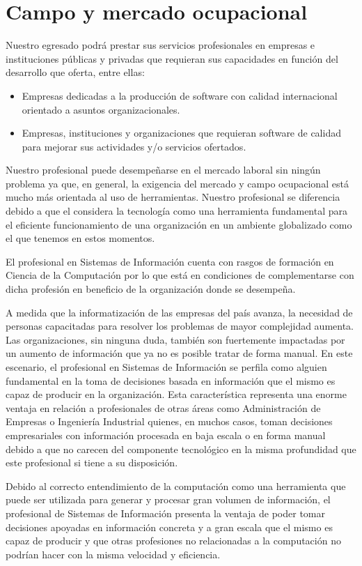 \section{Campo y mercado ocupacional}\label{sec:job-positions}
Nuestro egresado podrá prestar sus servicios profesionales en empresas e instituciones públicas y privadas 
que requieran sus capacidades en función del desarrollo que oferta, entre ellas:

\begin{itemize}
\item Empresas dedicadas a la producción de software con calidad internacional orientado a asuntos organizacionales.
\item Empresas, instituciones y organizaciones que requieran software de calidad para mejorar sus actividades y/o 
      servicios ofertados.
\end{itemize}

Nuestro profesional puede desempeñarse en el mercado laboral sin ningún problema ya que, en general, la 
exigencia del mercado y campo ocupacional está mucho más orientada al uso de herramientas. 
Nuestro profesional se diferencia debido a que el considera la tecnologí­a como una herramienta fundamental
para el eficiente funcionamiento de una organización en un ambiente globalizado como el que tenemos en estos momentos.

El profesional en Sistemas de Información cuenta con rasgos de formación en Ciencia de la Computación por 
lo que está en condiciones de complementarse con dicha profesión en beneficio de la organización donde se desempeña.

A medida que la informatización de las empresas del paí­s avanza, la necesidad de personas 
capacitadas para resolver los problemas de mayor complejidad aumenta. Las organizaciones, sin ninguna duda, 
también son fuertemente impactadas por un aumento de información que ya no es posible tratar de forma manual.
En este escenario, el profesional en Sistemas de Información se perfila como alguien fundamental en la toma 
de decisiones basada en información que el mismo es capaz de producir en la organización. 
Esta caracterí­stica representa una enorme ventaja en relación a profesionales de otras áreas como 
Administración de Empresas o Ingenierí­a Industrial quienes, en muchos casos, toman decisiones empresariales 
con información procesada en baja escala o en forma manual debido a que no carecen del componente 
tecnológico en la misma profundidad que este profesional si tiene a su disposición. 

Debido al correcto entendimiento de la computación como una herramienta que puede ser utilizada para 
generar y procesar gran volumen de información, el profesional de Sistemas de Información presenta 
la ventaja de poder tomar decisiones apoyadas en información concreta y a gran escala que el mismo es 
capaz de producir y que otras profesiones no relacionadas a la computación no podrí­an hacer con 
la misma velocidad y eficiencia.

